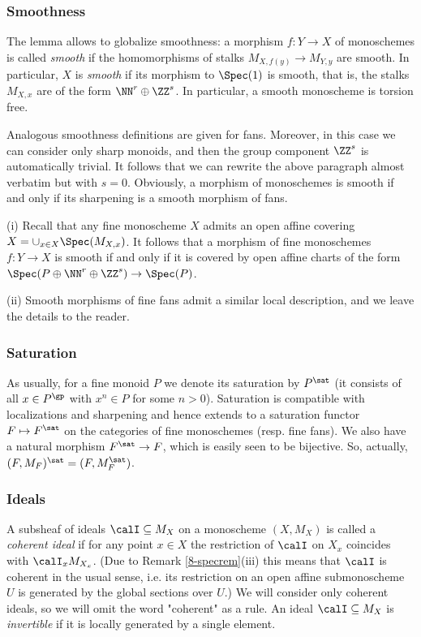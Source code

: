 \documentclass[10pt]{../fichiers-configuration-latex/smfart}
\begin{document}
\subsubsection{Smoothness}\label{8-smoothfansec} The lemma
allows to globalize smoothness: a morphism $f{\colon}Y\to X$
of monoschemes is called {\em smooth} if the homomorphisms of
stalks ${M}_{X,f(y)}\to{M}_{Y,y}$ are smooth. In particular, $X$
is {\em smooth} if its morphism to $\Spec(1)$ is smooth, that is,
the stalks ${M}_{X,x}$ are of the form $\NN^r\oplus\ZZ^s$. In
particular, a smooth monoscheme is torsion free.

Analogous smoothness definitions are given for fans. Moreover,
in this case we can consider only sharp monoids, and then the
group component $\ZZ^s$ is automatically trivial. It follows
that we can rewrite the above paragraph almost verbatim but with
$s=0$. Obviously, a morphism of monoschemes is smooth if and only
if its sharpening is a smooth morphism of fans.

\begin{remark2}\label{8-chartsmoothrem} (i) Recall that
any fine monoscheme $X$ admits an open affine covering
$X=\cup_{x\in X}\Spec(M_{X,x})$. It follows that a morphism
of fine monoschemes $f{\colon}Y\to X$ is smooth if and
only if it is covered by open affine charts of the form
$\Spec(P\oplus\NN^r\oplus\ZZ^s)\to\Spec(P)$.

(ii) Smooth morphisms of fine fans admit a similar local description,
and we leave the details to the reader.  \end{remark2}

\subsubsection{Saturation}\label{8-satursec} As usually, for a
fine monoid $P$ we denote its saturation by $P^\sat$ (it consists
of all $x\in P^\gp$ with $x^n\in P$ for some $n>0$). Saturation is
compatible with localizations and sharpening and hence extends to
a saturation functor $F\mapsto F^\sat$ on the categories of fine
monoschemes (resp. fine fans). We also have a natural morphism
$F^\sat\to F$, which is easily seen to be bijective. So, actually,
$(F,M_F)^\sat=(F,M_F^\sat)$.

\subsubsection{Ideals}\label{8-idealsec} A subsheaf of ideals
$\calI\subseteq M_X$ on a monoscheme $(X,{M}_X)$ is called a
{\em coherent ideal} if for any point $x\in X$ the restriction of
$\calI$ on $X_x$ coincides with $\calI_xM_{X_x}$. (Due to Remark
\ref{8-specrem}(iii) this means that $\calI$ is coherent in the usual
sense, i.e. its restriction on an open affine submonoscheme $U$ is
generated by the global sections over $U$.) We will consider only
coherent ideals, so we will omit the word "coherent" as a rule. An
ideal $\calI\subseteq{M}_X$ is {\em invertible} if it is locally
generated by a single element.
\end{document}
